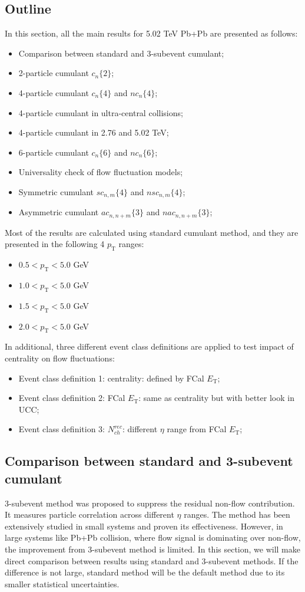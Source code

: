 \subsection{Outline}
In this section, all the main results for 5.02 TeV Pb+Pb are presented as follows:
\begin{itemize}
\item Comparison between standard and 3-subevent cumulant;
\item 2-particle cumulant $c_n\{2\}$;
\item 4-particle cumulant $c_n\{4\}$ and $nc_n\{4\}$;
\item 4-particle cumulant in ultra-central collisions;
\item 4-particle cumulant in 2.76 and 5.02 TeV;
\item 6-particle cumulant $c_n\{6\}$ and $nc_n\{6\}$;
\item Universality check of flow fluctuation models;
\item Symmetric cumulant $sc_{n,m}\{4\}$ and $nsc_{n,m}\{4\}$;
\item Asymmetric cumulant $ac_{n,n+m}\{3\}$ and $nac_{n,n+m}\{3\}$;
\end{itemize}
Most of the results are calculated using standard cumulant method, and they are presented in the following 4 $p_\text{T}$ ranges:
\begin{itemize}
\item $0.5<p_\text{T}<5.0$ GeV
\item $1.0<p_\text{T}<5.0$ GeV
\item $1.5<p_\text{T}<5.0$ GeV
\item $2.0<p_\text{T}<5.0$ GeV
\end{itemize}
In additional, three different event class definitions are applied to test impact of centrality on flow fluctuations:
\begin{itemize}
\item Event class definition 1: centrality: defined by FCal $E_\text{T}$;
\item Event class definition 2: FCal $E_\text{T}$: same as centrality but with better look in UCC;
\item Event class definition 3: $N_{ch}^{rec}$: different $\eta$ range from FCal $E_\text{T}$;
\end{itemize}

\subsection{Comparison between standard and 3-subevent cumulant}
3-subevent method was proposed to suppress the residual non-flow contribution. It measures particle correlation across different $\eta$ ranges. The method has been extensively studied in small systems and proven its effectiveness. However, in large systems like Pb+Pb collision, where flow signal is dominating over non-flow, the improvement from 3-subevent method is limited. In this section, we will make direct comparison between results using standard and 3-subevent methods. If the difference is not large, standard method will be the default method due to its smaller statistical uncertainties.

